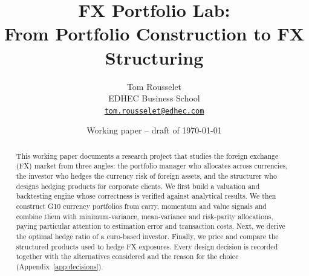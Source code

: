 \documentclass[11pt,a4paper]{article}
\title{FX Portfolio Lab:\\From Portfolio Construction to FX Structuring}
\author{Tom Rousselet\\EDHEC Business School\\\href{mailto:tom.rousselet@edhec.com}{\texttt{tom.rousselet@edhec.com}}}
\date{Working paper -- draft of \today}
\begin{document}
\maketitle

\begin{abstract}
\noindent
This working paper documents a research project that studies the foreign exchange (FX) market from three angles: the portfolio manager who allocates across currencies, the investor who hedges the currency risk of foreign assets, and the structurer who designs hedging products for corporate clients.
We first build a valuation and backtesting engine whose correctness is verified against analytical results.
We then construct G10 currency portfolios from carry, momentum and value signals and combine them with minimum-variance, mean-variance and risk-parity allocations, paying particular attention to estimation error and transaction costs.
Next, we derive the optimal hedge ratio of a euro-based investor.
Finally, we price and compare the structured products used to hedge FX exposures.
Every design decision is recorded together with the alternatives considered and the reason for the choice (Appendix~\ref{app:decisions}).
\end{abstract}

\tableofcontents
\bigskip














\appendix


\end{document}
